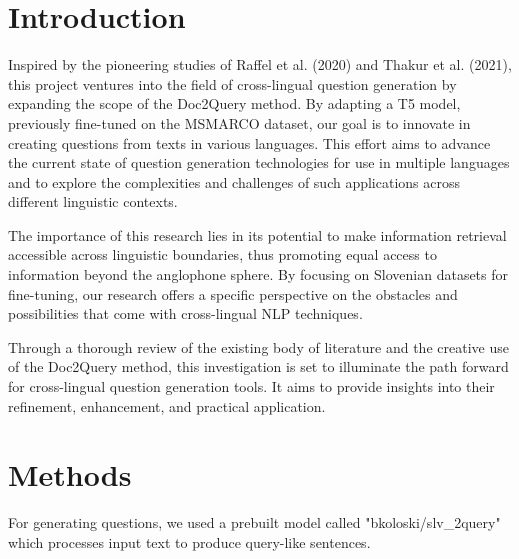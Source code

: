 \documentclass[fleqn,moreauthors,10pt]{ds_report}
\affiliation{\textit{Advisors: Boshko}}
\begin{document}
\flushbottom 

\maketitle 

\thispagestyle{empty} 


\section*{Introduction}
Inspired by the pioneering studies of Raffel et al. (2020) and Thakur et al. (2021), this project ventures into the field of cross-lingual question generation by expanding the scope of the Doc2Query method. By adapting a T5 model, previously fine-tuned on the MSMARCO dataset, our goal is to innovate in creating questions from texts in various languages. This effort aims to advance the current state of question generation technologies for use in multiple languages and to explore the complexities and challenges of such applications across different linguistic contexts.

The importance of this research lies in its potential to make information retrieval accessible across linguistic boundaries, thus promoting equal access to information beyond the anglophone sphere. By focusing on Slovenian datasets for fine-tuning, our research offers a specific perspective on the obstacles and possibilities that come with cross-lingual NLP techniques.

Through a thorough review of the existing body of literature and the creative use of the Doc2Query method, this investigation is set to illuminate the path forward for cross-lingual question generation tools. It aims to provide insights into their refinement, enhancement, and practical application.



\section*{Methods}
For generating questions, we used a prebuilt model called "bkoloski/slv\_2query" which processes input text to produce query-like sentences.
\end{document}
